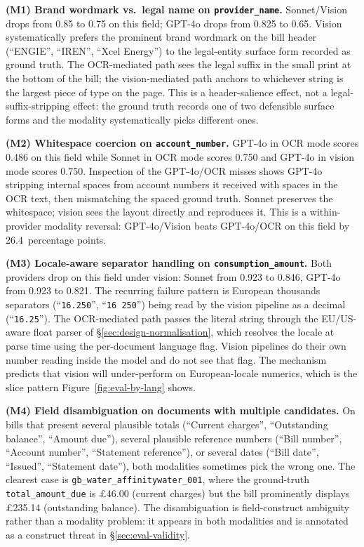 \textbf{(M1) Brand wordmark vs.\ legal name on
\texttt{provider\_name}.} Sonnet/Vision drops from 0.85 to 0.75 on
this field; GPT-4o drops from 0.825 to 0.65. Vision systematically
prefers the prominent brand wordmark on the bill header
(``ENGIE'', ``IREN'', ``Xcel Energy'') to the legal-entity surface
form recorded as ground truth. The OCR-mediated path sees the legal
suffix in the small print at the bottom of the bill; the
vision-mediated path anchors to whichever string is the largest
piece of type on the page. This is a header-salience effect, not a
legal-suffix-stripping effect: the ground truth records one of two
defensible surface forms and the modality systematically picks
different ones.

\textbf{(M2) Whitespace coercion on \texttt{account\_number}.} GPT-4o
in OCR mode scores 0.486 on this field while Sonnet in OCR mode
scores 0.750 and GPT-4o in vision mode scores 0.750. Inspection of
the GPT-4o/OCR misses shows GPT-4o stripping internal spaces from
account numbers it received with spaces in the OCR text, then
mismatching the spaced ground truth. Sonnet preserves the
whitespace; vision sees the layout directly and reproduces it. This
is a within-provider modality reversal: GPT-4o/Vision beats
GPT-4o/OCR on this field by 26.4~percentage points.

\textbf{(M3) Locale-aware separator handling on
\texttt{consumption\_amount}.} Both providers drop on this field
under vision: Sonnet from 0.923 to 0.846, GPT-4o from 0.923 to
0.821. The recurring failure pattern is European thousands
separators (``\texttt{16.250}'', ``\texttt{16\,250}'') being read by
the vision pipeline as a decimal (``\texttt{16.25}''). The
OCR-mediated path passes the literal string through the EU/US-aware
float parser of \S\ref{sec:design-normalisation}, which resolves
the locale at parse time using the per-document language flag.
Vision pipelines do their own number reading inside the model and
do not see that flag. The mechanism predicts that vision will
under-perform on European-locale numerics, which is the slice
pattern Figure~\ref{fig:eval-by-lang} shows.

\textbf{(M4) Field disambiguation on documents with multiple
candidates.} On bills that present several plausible totals
(``Current charges'', ``Outstanding balance'', ``Amount due''),
several plausible reference numbers (``Bill number'', ``Account
number'', ``Statement reference''), or several dates (``Bill date'',
``Issued'', ``Statement date''), both modalities sometimes pick the
wrong one. The clearest case is
\texttt{gb\_water\_affinitywater\_001}, where the ground-truth
\texttt{total\_amount\_due} is \pounds46.00 (current charges) but the
bill prominently displays \pounds235.14 (outstanding balance). The
disambiguation is field-construct ambiguity rather than a modality
problem: it appears in both modalities and is annotated as a
construct threat in \S\ref{sec:eval-validity}.

